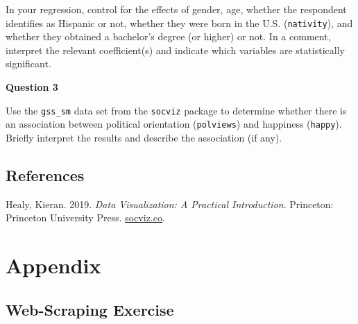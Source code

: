 \documentclass[
  letterpaper,
]{book}
\newlength{\cslhangindent}
\newlength{\cslentryspacingunit} %
\newenvironment{CSLReferences}[2] %
 {%
  \setlength{\parindent}{0pt}
  \ifodd #1
  \let\oldpar\par
  \def\par{\hangindent=\cslhangindent\oldpar}
  \fi
  \setlength{\parskip}{#2\cslentryspacingunit}
 }%
 {}
\begin{document}
In your regression, control for the effects of gender, age, whether the
respondent identifies as Hispanic or not, whether they were born in the
U.S. (\texttt{nativity}), and whether they obtained a bachelor's degree
(or higher) or not. In a comment, interpret the relevant coefficient(s)
and indicate which variables are statistically significant.

\textbf{Question 3}

Use the \texttt{gss\_sm} data set from the \texttt{socviz} package to
determine whether there is an association between political orientation
(\texttt{polviews}) and happiness (\texttt{happy}). Briefly interpret
the results and describe the association (if any).


\hypertarget{references}{%
\chapter*{References}\label{references}}


\hypertarget{refs}{}
\begin{CSLReferences}{1}{0}
\leavevmode{}%
Healy, Kieran. 2019. \emph{Data Visualization: A Practical
Introduction}. Princeton: Princeton University Press.
\href{https://socviz.co}{socviz.co}.

\end{CSLReferences}

\part{Appendix}

\hypertarget{web-scraping-exercise}{%
\chapter*{Web-Scraping Exercise}\label{web-scraping-exercise}}

\end{document}
